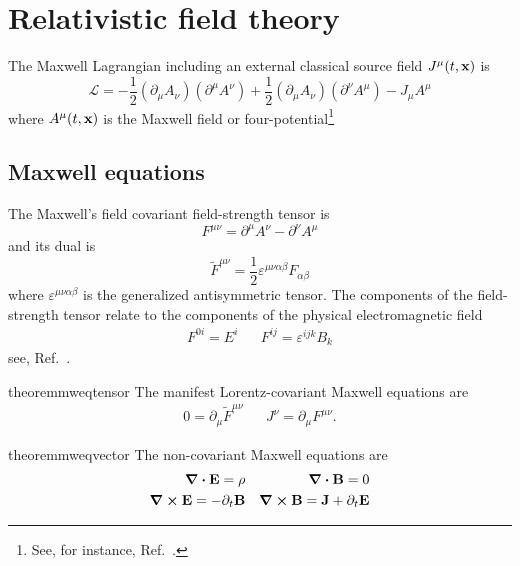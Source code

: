 \section{Relativistic field theory}

\begin{definition}
	The Maxwell Lagrangian including an external classical source field $J^\mu(t,\vb{x})$ is
	\begin{equation}
		\mathcal{L}
		=
		-
		\frac{1}{2}
		(\partial_\mu A_\nu)
		(\partial^\mu A^\nu)
		+
		\frac{1}{2}
		(\partial_\mu A_\nu)
		(\partial^\nu A^\mu)
		-
		J_\mu A^\mu
		\label{eq:mw_lagrangian}
	\end{equation}
	where $A^\mu(t,\vb{x})$ is the Maxwell field or four-potential\footnote{See, for instance, Ref.~\cite[p.~339]{Srednicki2007}.}
\end{definition}

\subsection{Maxwell equations}

\begin{definition}
	The Maxwell's field covariant field-strength tensor is
	\begin{equation}
		F^{\mu\nu}
		=
		\partial^\mu A^\nu
		-
		\partial^\nu A^\mu
	\end{equation}
	and its dual is
	\begin{equation}
		\tilde{F}^{\mu\nu}
		=
		\frac{1}{2}
		\varepsilon^{\mu\nu\alpha\beta}
		F_{\alpha\beta}
	\end{equation}
	where $\varepsilon^{\mu\nu\alpha\beta}$ is the generalized antisymmetric tensor.
	The components of the field-strength tensor relate to the components of the physical electromagnetic field
	\begin{align}
		F^{0i}
		=
		E^i
		&&
		F^{ij}
		=
		\varepsilon^{ijk}B_k
		\label{eq:mw_field_strength_components}
	\end{align}
	see, Ref.~\cite[p.~336]{Srednicki2007}.
\end{definition}
\begin{restatable}{theorem}{mweqtensor}\label{thm:tensor_maxwell_equations}
	The manifest Lorentz-covariant Maxwell equations are
	\begin{align}
		0
		=
		\partial_\mu
		\tilde{F}^{\mu\nu}
		&&
		J^\nu
		=
		\partial_\mu
		F^{\mu\nu}
		.
	\end{align}
\end{restatable}
\begin{restatable}{theorem}{mweqvector}\label{thm:vector_maxwell_equations}
	The non-covariant Maxwell equations are
	\begin{align}
		\div\vb{E}
		=
		\rho
		&&
		\div\vb{B}
		=
		0
		\label{eq:mw_homo_vec}
		\\
		\curl\vb{E}
		=
		-
		\partial_t\vb{B}
		&&
		\curl\vb{B}
		=
		\vb{J}
		+
		\partial_t\vb{E}
		\label{eq:mw_inhomo_vec}
	\end{align}
\end{restatable}

